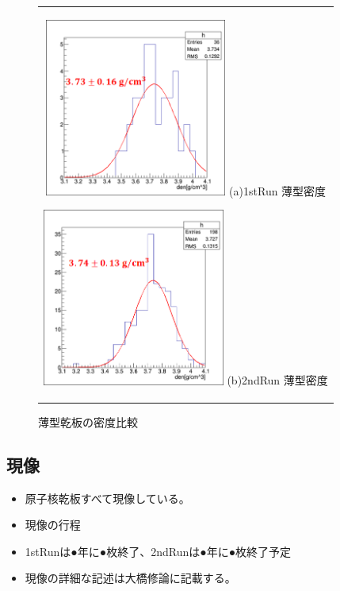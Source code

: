 \documentclass[12pt,a4paper]{jarticle}
\begin{document}
\begin{figure}[htbp]
    \begin{center}
      \begin{tabular}{c}
        \begin{minipage}{0.5\hsize}
          \begin{center}
            \includegraphics[clip, width=60mm]{1stRun_thin_den.png}
            \hspace{1.6cm} (a)1stRun 薄型密度
          \end{center}
        \end{minipage}
        
        \begin{minipage}{0.5\hsize}
          \begin{center}
            \includegraphics[clip, width=60mm]{2ndRun_thin_den.png}
            \hspace{1.6cm} (b)2ndRun 薄型密度
          \end{center}
        \end{minipage}
    
      \end{tabular}
      \caption{薄型乾板の密度比較\label{fig:compare_thin_den}}
    \end{center}
\end{figure}
\newpage
\subsection{現像}
\begin{itemize}
 \item 原子核乾板すべて現像している。
 \item 現像の行程
 \item 1stRunは●年に●枚終了、2ndRunは●年に●枚終了予定
 \item 現像の詳細な記述は大橋修論に記載する。
\end{itemize}
\end{document}
